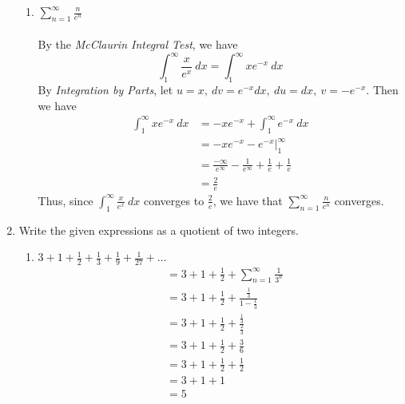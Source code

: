\documentclass[12pt,letterpaper]{article}
\theoremstyle{case}
\theoremstyle{definition}
\begin{document}
\begin{enumerate}
\begin{enumerate}
			\item $\displaystyle\sum_{n=1}^{\infty} \frac{n}{e^n}$
			\\\\By the \textit{McClaurin Integral Test}, we have
			\[\int_{1}^{\infty}\frac{x}{e^x}\ dx = \int_{1}^{\infty}xe^{-x}\ dx\]
			By \textit{Integration by Parts}, let $u=x,\ dv=e^{-x}dx,\ du=dx,\ v=-e^{-x}$. Then we have
			\begin{align*}
				\int_{1}^{\infty} xe^{-x}\ dx &= -xe^{-x}+\int_{1}^{\infty} e^{-x}\ dx \\
				&= \left.-xe^{-x}-e^{-x}\right|_1^\infty \\
				&= \frac{-\infty}{e^\infty}-\frac{1}{e^\infty} +\frac{1}{e}+\frac{1}{e} \\
				&= \frac{2}{e}
			\end{align*}
			Thus, since $\displaystyle\int_{1}^{\infty} \frac{x}{e^x}\ dx$ converges to $\frac{2}{e}$, we have that $\displaystyle\sum_{n=1}^{\infty} \frac{n}{e^n}$ converges.
		\end{enumerate}
	
		\item Write the given expressions as a quotient of two integers.
		\begin{enumerate}
			\item $3+1+\frac{1}{2} + \frac{1}{3} + \frac{1}{9} + \frac{1}{27} + \dots $
			\begin{align*}
				&= 3+1+\frac{1}{2}+\sum_{n=1}^{\infty} \frac{1}{3^n} \\
				&= 3+1+\frac{1}{2}+\frac{\frac{1}{3}}{1-\frac{1}{3}} \\
				&= 3+1+\frac{1}{2}+\frac{\frac{1}{3}}{\frac{2}{3}} \\
				&= 3+1+\frac{1}{2}+\frac{3}{6} \\
				&= 3+1+\frac{1}{2}+\frac{1}{2} \\
				&= 3+1+1 \\
				&= 5
			\end{align*}
			

\end{enumerate}
\end{enumerate}
\end{document}
